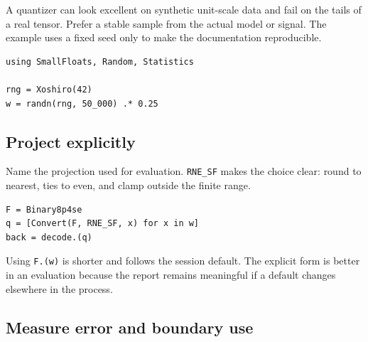 \label{8040325625047761261}{}


A quantizer can look excellent on synthetic unit-scale data and fail on the tails of a real tensor. Prefer a stable sample from the actual model or signal. The example uses a fixed seed only to make the documentation reproducible.




\begin{verbatim}
using SmallFloats, Random, Statistics

rng = Xoshiro(42)
w = randn(rng, 50_000) .* 0.25
\end{verbatim}



\subsection{Project explicitly}



\label{14451035741012458102}{}


Name the projection used for evaluation. \texttt{RNE\_\allowbreak{}SF} makes the choice clear: round to nearest, ties to even, and clamp outside the finite range.




\begin{verbatim}
F = Binary8p4se
q = [Convert(F, RNE_SF, x) for x in w]
back = decode.(q)
\end{verbatim}



Using \texttt{F.(w)} is shorter and follows the session default. The explicit form is better in an evaluation because the report remains meaningful if a default changes elsewhere in the process.



\subsection{Measure error and boundary use}



\label{17082490246171686115}{}



